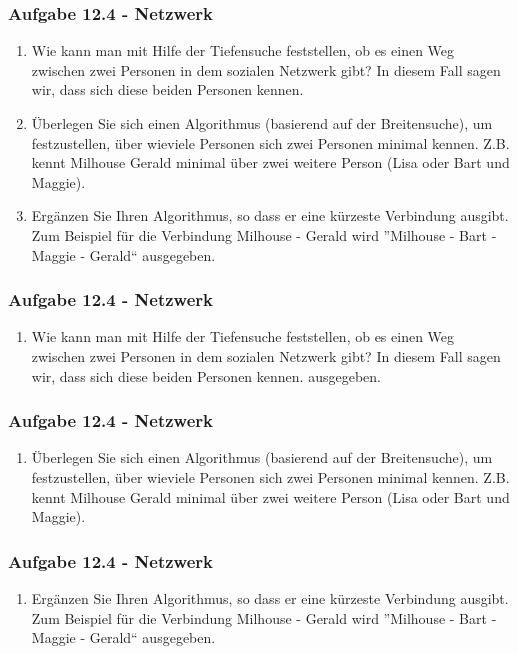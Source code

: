 \documentclass{beamer}
\begin{document}
\begin{frame}
	\frametitle{Aufgabe 12.4 - Netzwerk}
	\small
	\begin{enumerate}[label=\textcolor{black}{\alph*)},align=left,leftmargin=*,itemsep=0.75em]
		\item Wie kann man mit Hilfe der Tiefensuche feststellen, ob es einen Weg zwischen zwei
		      Personen in dem sozialen Netzwerk gibt? In diesem Fall sagen wir, dass sich diese
		      beiden Personen kennen.
		\item Überlegen Sie sich einen Algorithmus (basierend auf der Breitensuche), um festzustellen,
		      über wieviele Personen sich zwei Personen minimal kennen. Z.B. kennt Milhouse
		      Gerald minimal über zwei weitere Person (Lisa oder Bart und Maggie).
		\item Ergänzen Sie Ihren Algorithmus, so dass er eine kürzeste Verbindung ausgibt. Zum
		      Beispiel für die Verbindung Milhouse - Gerald wird ”Milhouse - Bart - Maggie - Gerald“
		      ausgegeben.
	\end{enumerate}
\end{frame}

\begin{frame}[t]
	\frametitle{Aufgabe 12.4 - Netzwerk}
	\small
	\begin{enumerate}[label=\textcolor{black}{\alph*)},align=left,leftmargin=*,itemsep=0.75em]
		\item Wie kann man mit Hilfe der Tiefensuche feststellen, ob es einen Weg zwischen zwei
		      Personen in dem sozialen Netzwerk gibt? In diesem Fall sagen wir, dass sich diese
		      beiden Personen kennen.
		      ausgegeben.
	\end{enumerate}
\end{frame}

\begin{frame}[t]
	\frametitle{Aufgabe 12.4 - Netzwerk}
	\small
	\begin{enumerate}[label=\textcolor{black}{\alph*)},align=left,leftmargin=*,itemsep=0.75em,start=2]
		\item Überlegen Sie sich einen Algorithmus (basierend auf der Breitensuche), um festzustellen,
		      über wieviele Personen sich zwei Personen minimal kennen. Z.B. kennt Milhouse
		      Gerald minimal über zwei weitere Person (Lisa oder Bart und Maggie).
	\end{enumerate}
\end{frame}

\begin{frame}[t]
	\frametitle{Aufgabe 12.4 - Netzwerk}
	\small
	\begin{enumerate}[label=\textcolor{black}{\alph*)},align=left,leftmargin=*,itemsep=0.75em,start=3]
		\item Ergänzen Sie Ihren Algorithmus, so dass er eine kürzeste Verbindung ausgibt. Zum
		      Beispiel für die Verbindung Milhouse - Gerald wird ”Milhouse - Bart - Maggie - Gerald“
		      ausgegeben.
	\end{enumerate}
\end{frame}
\end{document}
